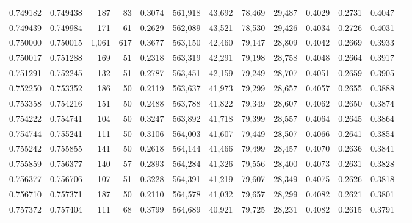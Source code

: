 \begin{tabular}{rrrrrrrrrrrrr}
0.749182 & 0.749438 &   187 &  83 &                                     0.3074 & 561,918 &  43,692 &  78,469 &  29,487 & 0.4029 & 0.2731 & 0.4047 \\
0.749439 & 0.749984 &   171 &  61 &                                     0.2629 & 562,089 &  43,521 &  78,530 &  29,426 & 0.4034 & 0.2726 & 0.4031 \\
0.750000 & 0.750015 & 1,061 & 617 &                                     0.3677 & 563,150 &  42,460 &  79,147 &  28,809 & 0.4042 & 0.2669 & 0.3933 \\
0.750017 & 0.751288 &   169 &  51 &                                     0.2318 & 563,319 &  42,291 &  79,198 &  28,758 & 0.4048 & 0.2664 & 0.3917 \\
0.751291 & 0.752245 &   132 &  51 &                                     0.2787 & 563,451 &  42,159 &  79,249 &  28,707 & 0.4051 & 0.2659 & 0.3905 \\
0.752250 & 0.753352 &   186 &  50 &                                     0.2119 & 563,637 &  41,973 &  79,299 &  28,657 & 0.4057 & 0.2655 & 0.3888 \\
0.753358 & 0.754216 &   151 &  50 &                                     0.2488 & 563,788 &  41,822 &  79,349 &  28,607 & 0.4062 & 0.2650 & 0.3874 \\
0.754222 & 0.754741 &   104 &  50 &                                     0.3247 & 563,892 &  41,718 &  79,399 &  28,557 & 0.4064 & 0.2645 & 0.3864 \\
0.754744 & 0.755241 &   111 &  50 &                                     0.3106 & 564,003 &  41,607 &  79,449 &  28,507 & 0.4066 & 0.2641 & 0.3854 \\
0.755242 & 0.755855 &   141 &  50 &                                     0.2618 & 564,144 &  41,466 &  79,499 &  28,457 & 0.4070 & 0.2636 & 0.3841 \\
0.755859 & 0.756377 &   140 &  57 &                                     0.2893 & 564,284 &  41,326 &  79,556 &  28,400 & 0.4073 & 0.2631 & 0.3828 \\
0.756377 & 0.756706 &   107 &  51 &                                     0.3228 & 564,391 &  41,219 &  79,607 &  28,349 & 0.4075 & 0.2626 & 0.3818 \\
0.756710 & 0.757371 &   187 &  50 &                                     0.2110 & 564,578 &  41,032 &  79,657 &  28,299 & 0.4082 & 0.2621 & 0.3801 \\
0.757372 & 0.757404 &   111 &  68 &                                     0.3799 & 564,689 &  40,921 &  79,725 &  28,231 & 0.4082 & 0.2615 & 0.3791 \\

\end{tabular}
